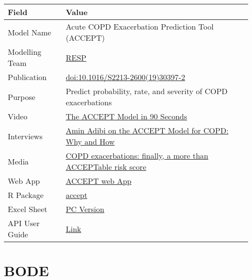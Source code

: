 \documentclass[
]{book}
\begin{document}
\begin{longtable}[]{@{}ll@{}}
\toprule
Field & Value\tabularnewline
\midrule
\endhead
Model Name & Acute COPD Exacerbation Prediction Tool (ACCEPT)\tabularnewline
Modelling Team & \href{http://resp.core.ubc.ca}{RESP}\tabularnewline
Publication & \href{https://doi.org/10.1016/S2213-2600(19)30397-2}{doi:10.1016/S2213-2600(19)30397-2}\tabularnewline
Purpose & Predict probability, rate, and severity of COPD exacerbations\tabularnewline
Video & \href{https://www.peermodelsnetwork.com/educational-videos?wix-vod-video-id=679cbb410686401193779a2931731c56\&wix-vod-comp-id=comp-k8q9lys1}{The ACCEPT Model in 90 Seconds}\tabularnewline
Interviews & \href{https://www.peermodelsnetwork.com/post/amin-adibi-on-the-accept-model-for-copd-why-and-how}{Amin Adibi on the ACCEPT Model for COPD: Why and How}\tabularnewline
Media & \href{https://doi.org/10.1016/S2213-2600(20)30049-7}{COPD exacerbations: finally, a more than ACCEPTable risk score}\tabularnewline
Web App & \href{http://resp.core.ubc.ca/ipress/accept}{ACCEPT web App}\tabularnewline
R Package & \href{https://cran.r-project.org/package=accept}{accept}\tabularnewline
Excel Sheet & \href{https://drive.google.com/uc?export=download\&id=1NNE7pKBVP939tly-6JISaVw-y33m8y28}{PC Version}\tabularnewline
API User Guide & \href{https://resplab.github.io/prismguide/api-users-guide.html\#accept}{Link}\tabularnewline
\bottomrule
\end{longtable}

\hypertarget{bode}{%
\chapter{BODE}\label{bode}}
\end{document}
